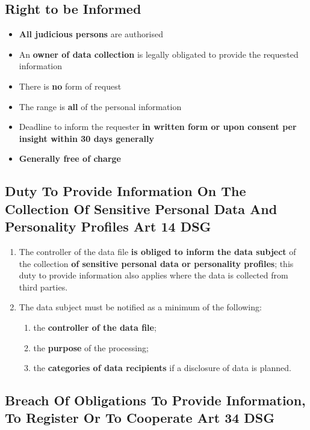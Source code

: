\documentclass[11pt]{article}
\theoremstyle{definition}
\begin{document}
\subsection{Right to be Informed}
\begin{itemize}
	\item \textbf{All judicious persons} are authorised
	\item An \textbf{owner of data collection} is legally obligated to provide the requested information
	\item There is \textbf{no} form of request
	\item The range is \textbf{all} of the personal information
	\item Deadline to inform the requester \textbf{in written form or upon consent per insight within 30 days generally}
	\item \textbf{Generally free of charge}
\end{itemize}

\subsection{Duty To Provide Information On The Collection Of Sensitive Personal Data And Personality Profiles Art 14 DSG}
\begin{enumerate}[label=\arabic*]
	\item The controller of the data file \textbf{is obliged to inform the data subject} of the collection \textbf{of sensitive personal data or personality profiles}; this duty to provide information also applies where the data is collected from third parties.
	\item The data subject must be notified as a minimum of the following:
	\begin{enumerate}[label=\alph*.]
		\item the \textbf{controller of the data file};
		\item the \textbf{purpose} of the processing;
		\item the \textbf{categories of data recipients} if a disclosure of data is planned.
	\end{enumerate}
\end{enumerate}

\subsection{Breach Of Obligations To Provide Information, To Register Or To Cooperate Art 34 DSG}
\end{document}
